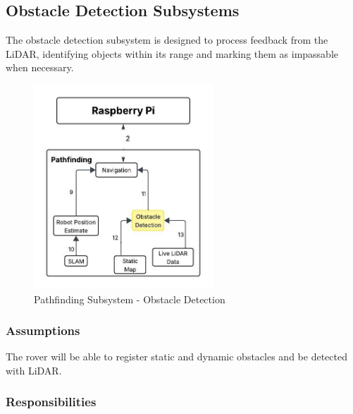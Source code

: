 \subsection{Obstacle Detection Subsystems}
The obstacle detection subsystem is designed to process feedback from the LiDAR, identifying objects within its range and marking them as impassable when necessary.
\begin{figure}[h!]
	\centering
 	\includegraphics[width=0.60\textwidth]{images/pathfinding 2/Data_Flow_ObstacleD.jpeg}
 \caption{Pathfinding Subsystem - Obstacle Detection} %
\end{figure}

\subsubsection{Assumptions}
The rover will be able to register static and dynamic obstacles and be detected with LiDAR.
\subsubsection{Responsibilities}

